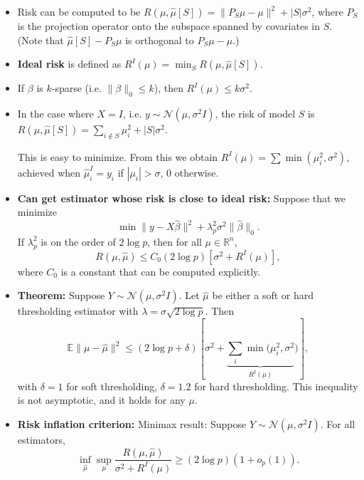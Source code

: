 \documentclass[twoside]{article}
\newcommand\dis{\displaystyle}
\newcommand\bbE{\mathbb{E}}
\newcommand\bbR{\mathbb{R}}
\newcommand\calN{\mathcal{N}}
\newcommand\dlt{\delta}
\newcommand\lmb{\lambda}
\newcommand\sg{\sigma}
\begin{document}
\begin{itemize}
\item Risk can be computed to be $R(\mu, \hat{\mu}[S]) = \| P_S \mu - \mu \|^2 + |S|\sg^2$, where $P_S$ is the projection operator onto the subspace spanned by covariates in $S$. (Note that $\hat{\mu}[S] - P_S \mu$ is orthogonal to $P_S \mu - \mu$.)

\item \textbf{Ideal risk} is defined as $R^I(\mu) = \dis\min_S R(\mu, \hat{\mu}[S])$.

\item If $\beta$ is $k$-sparse (i.e. $\|\beta\|_0 \leq k$), then $R^I(\mu) \leq k\sg^2$.

\item In the case where $X = I$, i.e. $y \sim \calN(\mu, \sg^2 I)$, the risk of model $S$ is $R(\mu, \hat{\mu}[S]) = \dis\sum_{i \notin S} \mu_i^2 + |S|\sg^2$.

This is easy to minimize. From this we obtain $R^I(\mu) = \sum \min(\mu_i^2, \sg^2)$, achieved when $\hat{\mu}_i^I = y_i$ if $|\mu_i| > \sg$, $0$ otherwise.

\item \textbf{Can get estimator whose risk is close to ideal risk:} Suppose that we minimize 
\[\min \| y - X\hat{\beta} \|^2 + \lmb_p^2 \sg^2 \|\hat{\beta}\|_0.\]
If $\lmb_p^2$ is on the order of $2 \log p$, then for all $\mu \in \bbR^n$,
\[ R(\mu, \hat{\mu}) \leq C_0 (2 \log p) [\sg^2 + R^I(\mu)], \]
where $C_0$ is a constant that can be computed explicitly.

\item \textbf{Theorem:} Suppose $Y \sim \calN(\mu, \sg^2 I)$. Let $\hat{\mu}$ be either a soft or hard thresholding estimator with $\lmb = \sg \sqrt{2 \log p}$. Then
\[ \bbE \|\mu - \hat{\mu}\|^2 \leq (2 \log p + \dlt) \left[ \sg^2 + \underbrace{\sum_i \min(\mu_i^2, \sg^2}_{R^I(\mu)}) \right], \]
with $\dlt = 1$ for soft thresholding, $\dlt = 1.2$ for hard thresholding. This inequality is not asymptotic, and it holds for any $\mu$.

\item \textbf{Risk inflation criterion:} Minimax result: Suppose $Y \sim \calN(\mu, \sg^2 I)$. For all estimators,
\[ \inf_{\hat{\mu}} \sup_{\mu} \frac{R(\mu, \hat{\mu})}{\sg^2 + R^I (\mu)}  \geq (2 \log p)(1 + o_p(1)). \]

\end{itemize}
\end{document}
